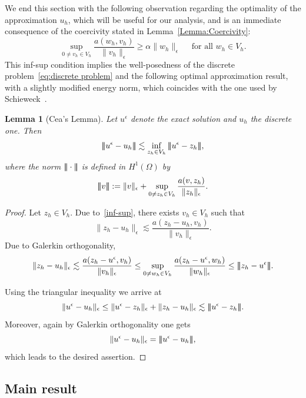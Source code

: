 \documentclass{article}
\newcommand{\vvvert}{\ensuremath|\!|\!|\xspace}
\newtheorem{lemma}[thm]{Lemma}
\newcommand{\tfa}{\text{ for all }}
\newcommand{\ueps}{u^\epsilon}
\begin{document}
We end this section with the following observation regarding the optimality of the approximation $u_h$, which will be useful for our analysis, and is an immediate consequence of the coercivity stated in Lemma~\ref{Lemma:Coercivity}:
\begin{equation}\label{inf-sup}
\sup_{0\not= v_h\in V_h} \frac{a(w_h,v_h)}{\|v_h\|_\epsilon} \geq \alpha \|w_h\|_\epsilon
\quad\tfa w_h\in V_h.
\end{equation}
This inf-sup condition implies the well-posedness of the discrete problem~\eqref{eq:discrete problem} and the following optimal approximation result, with a slightly modified energy norm, which coincides with the one used by Schieweck~\cite{thesisSchieweck}.

\begin{lemma}[Cea's Lemma]
\label{Lemma:Cea}
Let $\ueps$ denote the exact solution and $u_h$ the discrete one. Then
$$
\vvvert \ueps - u_h\vvvert  \lesssim \inf_{z_h\in V_h} \vvvert  \ueps - z_h\vvvert ,
$$
where the norm $\vvvert \cdot\vvvert $ is defined in $H^1(\Omega)$ by
\begin{equation}
\label{eq:||| norm}
\vvvert  v\vvvert   := \|v\|_\epsilon + 
\sup_{0\not= z_h\in V_h} \frac{a(v,z_h)}{\|z_h\|_\epsilon}.
\end{equation}
\end{lemma}

\begin{proof}
Let $z_h\in V_h$. Due to~\eqref{inf-sup}, there exists $v_h \in V_h$ such that
\begin{equation*}
\|z_h - u_h\|_\epsilon \lesssim \frac{a(z_h-u_h,v_h)}{\|v_h\|_\epsilon}.
\end{equation*}
Due to Galerkin orthogonality,
\[
\|z_h - u_h\|_\epsilon \lesssim
\frac{a(z_h-\ueps,v_h)}{\|v_h\|_\epsilon} 
\leq \sup_{0\not= w_h\in V_h} \frac{a(z_h-\ueps,w_h)}{\|w_h\|_\epsilon} \leq \vvvert z_h -\ueps\vvvert .
\]

Using the triangular inequality we arrive at
$$
\|\ueps - u_h\|_\epsilon \leq \|\ueps - z_h\|_\epsilon + \|z_h-u_h\|_\epsilon
    \lesssim \vvvert \ueps  - z_h\vvvert .
$$
Moreover, again by Galerkin orthogonality one gets
$$
\|\ueps - u_h\|_\epsilon = \vvvert  \ueps - u_h\vvvert ,
$$
which leads to the desired assertion.
\end{proof}


\subsection{Main result}\label{Sec:mainresult}
\end{document}
